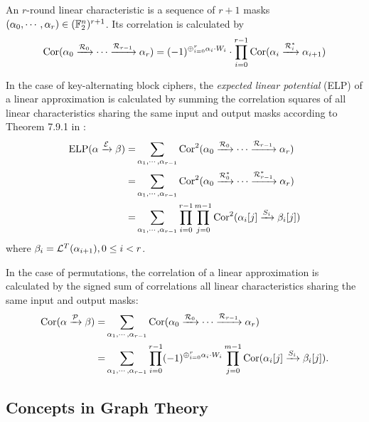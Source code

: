 \begin{definition}
    An $r$-round linear characteristic is a sequence of $r+1$ masks $(\alpha_0,\cdots,\alpha_r)\in(\mathbb{F}_2^n)^{r+1}$. Its correlation is calculated by
    \begin{align*}
        \text{Cor}(\alpha_0\xrightarrow{\mathcal{R}_0}\cdots\xrightarrow{\mathcal{R}_{r-1}}\alpha_r)
        =(-1)^{\oplus_{i=0}^r \alpha_i\cdot W_i}\cdot\prod\limits_{i=0}^{r-1}\text{Cor}(\alpha_i\xrightarrow{\mathcal{R}_i^*}\alpha_{i+1})
    \end{align*}
\end{definition}

In the case of key-alternating block ciphers, the \textit{expected linear potential} (ELP) of a linear approximation is calculated by summing the correlation squares of all linear characteristics sharing the same input and output masks according to Theorem 7.9.1 in \cite{daemen2002design}:
\begin{align*}
    \text{ELP}(\alpha\xrightarrow{\mathcal{E}}\beta)=&\sum\limits_{\alpha_1,\cdots,\alpha_{r-1}}\text{Cor}^2(\alpha_0\xrightarrow{\mathcal{R}_0}\cdots\xrightarrow{\mathcal{R}_{r-1}}\alpha_r)\\
    =&\sum\limits_{\alpha_1,\cdots,\alpha_{r-1}}\text{Cor}^2(\alpha_0\xrightarrow{\mathcal{R}_0^*}\cdots\xrightarrow{\mathcal{R}_{r-1}^*}\alpha_r)\\
    =&\sum\limits_{\alpha_1,\cdots,\alpha_{r-1}}\prod\limits_{i=0}^{r-1}\prod\limits_{j=0}^{m-1}\text{Cor}^2(\alpha_i[j]\xrightarrow{S_i}\beta_i[j])
\end{align*}
where $\beta_i=\mathcal{L}^T(\alpha_{i+1}),0\leq i<r$.

In the case of permutations, the correlation of a linear approximation is calculated by the signed sum of correlations all linear characteristics sharing the same input and output masks:
\begin{align*}
    \text{Cor}(\alpha\xrightarrow{\mathcal{P}}\beta)=&\sum\limits_{\alpha_1,\cdots,\alpha_{r-1}}\text{Cor}(\alpha_0\xrightarrow{\mathcal{R}_0}\cdots\xrightarrow{\mathcal{R}_{r-1}}\alpha_r)\\
    =&\sum\limits_{\alpha_1,\cdots,\alpha_{r-1}}\prod\limits_{i=0}^{r-1} (-1)^{\oplus_{i=0}^r \alpha_i\cdot W_i} \prod\limits_{j=0}^{m-1}\text{Cor}(\alpha_i[j]\xrightarrow{S_i}\beta_i[j]).
\end{align*}

\subsection{Concepts in Graph Theory}

